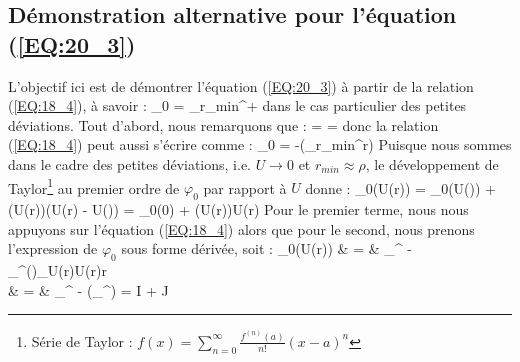 \subsection{D\'emonstration alternative pour l'\'equation (\ref{EQ:20_3})}

L'objectif ici est de d\'emontrer l'\'equation (\ref{EQ:20_3}) \`a partir de la relation (\ref{EQ:18_4}), \`a savoir :
\benn
	\varphi_{0} = \bigintss_{r_{min}}^{+\infty}{}
\eenn
dans le cas particulier des petites d\'eviations. Tout d'abord, nous remarquons que :
\benn
	 =  = 
\eenn
donc la relation (\ref{EQ:18_4}) peut aussi s'\'ecrire comme :
\benn
	\varphi_{0} = -\dfrac{\partial}{\partial \rho}\left(\bigintsss_{r_{min}}^{\infty}r\right)
\eenn
Puisque nous sommes dans le cadre des petites d\'eviations, i.e. $U \rightarrow 0$ et $r_{min} \approx \rho$, le d\'eveloppement de Taylor\footnote{S\'erie de Taylor : $f(x) = \sum_{n=0}^{\infty}\frac{f^{(n)}(a)}{n!}(x - a)^{n}$} au premier ordre de $\varphi_{0}$ par rapport \`a $U$ donne :
\benn
	\varphi_{0}(U(r)) = \varphi_{0}(U(\infty)) + (U(r))\cdot(U(r) - U(\infty))  = \varphi_{0}(0) + (U(r))\cdot U(r)
\eenn
Pour le premier terme, nous nous appuyons sur l'\'equation (\ref{EQ:18_4}) alors que pour le second, nous prenons l'expression de $\varphi_{0}$ sous forme d\'eriv\'ee, soit :
\bea
	\varphi_{0}(U(r)) & = & \bigintss_{\rho}^{\infty} - \dfrac{\partial}{\partial\rho}\bigints_{\rho}^{\infty}\left(\right)_{U(r)}\cdot U(r)r \nonumber \\
	& = & \bigintss_{\rho}^{\infty} - \dfrac{\partial}{\partial\rho}\left(\bigintss_{\rho}^{\infty}\right) = I + \dfrac{\partial}{\partial\rho}J \nonumber
